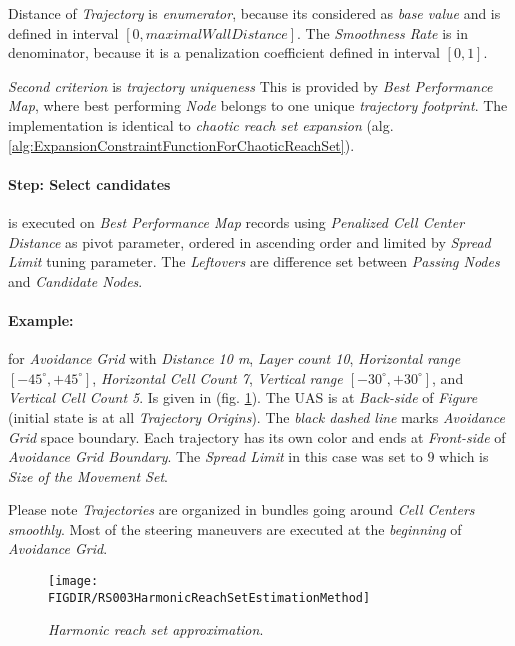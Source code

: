 \noindent Distance of \emph{Trajectory} is \emph{enumerator}, because its considered as \emph{base value} and is defined in interval $[0,maximalWallDistance]$. The \emph{Smoothness Rate} is in denominator, because it is a penalization coefficient defined in interval $[0,1]$. 

\emph{Second criterion} is \emph{trajectory uniqueness} This is provided by \emph{Best Performance Map}, where best performing \emph{Node} belongs to one unique \emph{trajectory footprint}. The implementation is identical to \emph{chaotic reach set expansion} (alg. \ref{alg:ExpansionConstraintFunctionForChaoticReachSet}).

\paragraph{Step: Select candidates} is executed  on \emph{Best Performance Map} records using \emph{Penalized Cell Center Distance} as pivot parameter, ordered in ascending order and limited by \emph{Spread Limit} tuning parameter. The \emph{Leftovers} are difference set between \emph{Passing Nodes} and \emph{Candidate Nodes}.




\paragraph{Example:} for \emph{Avoidance Grid} with \emph{Distance 10 m}, \emph{Layer count 10}, \emph{Horizontal range $[-45^\circ,+45^\circ]$}, \emph{Horizontal Cell Count 7}, \emph{Vertical range $[-30^\circ,+30^\circ]$}, and \emph{Vertical Cell Count 5}. Is given in (fig. \ref{fig:harmonicReachSetApproximation}). The UAS is at \emph{Back-side} of \emph{Figure} (initial state is at all \emph{Trajectory Origins}). The \emph{black dashed line} marks \emph{Avoidance Grid} space boundary. Each trajectory has its own color and ends at \emph{Front-side} of \emph{Avoidance Grid Boundary}. The \emph{Spread Limit} in this case was set to $9$ which is \emph{Size of the Movement Set}.

\begin{note}
    Please note \emph{Trajectories} are organized in bundles going around \emph{Cell Centers smoothly}. Most of the steering maneuvers are executed at the \emph{beginning} of \emph{Avoidance Grid}.
\end{note}

\begin{figure}[H]
    \centering
    \texttt{[image: \\FIGDIR/RS003HarmonicReachSetEstimationMethod]} 
    \caption{\emph{Harmonic \emph{reach set} approximation}.}
    \label{fig:harmonicReachSetApproximation}
\end{figure}

